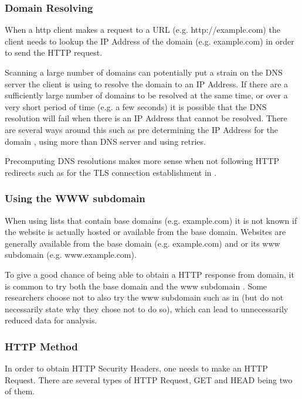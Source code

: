 \documentclass{mscreport}
\begin{document}
\subsubsection{Domain Resolving}

When a http client makes a request to a URL (e.g. http://example.com) the client needs to lookup the IP Address of the domain (e.g. example.com) in order to send the HTTP request.

\vspace{0.3cm} \noindent
Scanning a large number of domains can potentially put a strain on the DNS server the client is using to resolve the domain to an IP Address. If there are a sufficiently large number of domains to be resolved at the same time, or over a very short period of time (e.g. a few seconds) it is possible that the DNS resolution will fail when there is an IP Address that cannot be resolved. There are several ways around this such as pre determining the IP Address for the domain \cite{Amann2017-co}, using more than DNS server and using retries.

\vspace{0.3cm} \noindent
Precomputing DNS resolutions makes more sense when not following HTTP redirects such as for the TLS connection establishment in \cite{Amann2017-co,Holz2020-ha}.

\subsubsection{Using the WWW subdomain}

When using lists that contain base domains (e.g. example.com) it is not known if the website is actually hosted or available from the base domain. Websites are generally available from the base domain (e.g. example.com) and or its www subdomain (e.g. www.example.com).

\vspace{0.3cm} \noindent
To give a good chance of being able to obtain a HTTP response from domain, it is common to try both the base domain and the www subdomain \cite{Chen2016-dl,Kumar2017-qw,Ying2016-ag,Michael2015-hn}. Some researchers choose not to also try the www subdomain such as in \cite{Buchanan2018-xz,Amann2017-co} (but do not necessarily state why they chose not to do so), which can lead to unnecessarily reduced data for analysis.

\subsubsection{HTTP Method}
In order to obtain HTTP Security Headers, one needs to make an HTTP Request. There are several types of HTTP Request, GET and HEAD being two of them.
\end{document}
